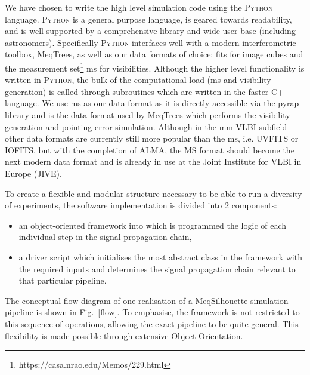 We have chosen to write the high level simulation code using the \textsc{Python} language. \textsc{Python} is a general purpose language, is geared towards readability, and is well supported by a comprehensive library and wide user base (including astronomers). Specifically \textsc{Python} interfaces well with a modern interferometric toolbox, {\sc MeqTrees}, as well as our data formats of choice: {\sc fits} for image cubes and the {\sc measurement set}\footnote{https://casa.nrao.edu/Memos/229.html} {\sc ms} for visibilities. Although the higher level functionality is written in \textsc{Python}, the bulk of the computational load ({\sc ms} and visibility generation) is called through subroutines which are written in the faster {\sc C++} language. 
We use {\sc ms} as our data format as it is directly accessible via the {\sc pyrap} library and is the data format used by {\sc MeqTrees} which performs the visibility generation and pointing error simulation. Although in the mm-VLBI subfield other data formats are currently still more popular than the {\sc ms}, i.e. {\sc UVFITS} or {\sc IOFITS}, but with the completion of ALMA, the MS format should become the next modern data format and is already in use at the Joint Institute for VLBI in Europe (JIVE). 


To create a flexible and modular structure necessary to be able to run a diversity of experiments, the software implementation is divided into 2 components:
\begin{itemize}
 \item an object-oriented framework into which is programmed the logic of each individual step in the signal propagation chain,
 \item a driver script which initialises the most abstract class in the framework with the required inputs and determines the signal propagation chain relevant to that particular pipeline.
\end{itemize}
The conceptual flow diagram of one realisation of a {\sc MeqSilhouette} simulation pipeline is shown in Fig.~\ref{flow}. To emphasise, the framework is not restricted to this sequence of operations, allowing the exact pipeline to be quite general. This flexibility is made possible through extensive Object-Orientation. 


